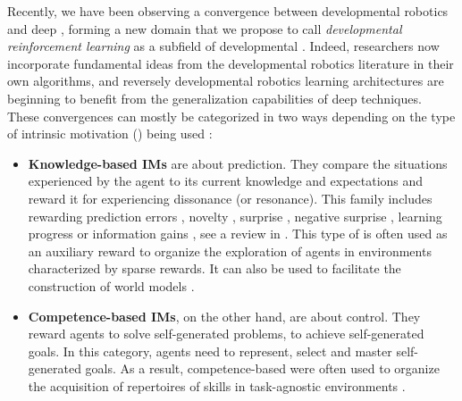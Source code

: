 Recently, we have been observing a convergence between developmental robotics and deep \rl, forming a new domain that we propose to call \textit{developmental reinforcement learning} as a subfield of developmental \ai. Indeed, \rl researchers now incorporate fundamental ideas from the developmental robotics literature in their own algorithms, and reversely developmental robotics learning architectures are beginning to benefit from the generalization capabilities of deep \rl techniques. These convergences can mostly be categorized in two ways depending on the type of intrinsic motivation (\ims) being used \citep{oudeyer2007intrinsic}:
\begin{itemize}
    \item
    \textbf{Knowledge-based IMs} are about prediction. They compare the situations experienced by the agent to its current knowledge and expectations and reward it for experiencing dissonance (or resonance). This family includes \ims rewarding prediction errors \citep{schmidhuber1991possibility,pathak2017curiosity}, novelty \citep{bellemare2016unifying,burda2018exploration,raileanu2020ride}, surprise \citep{achiam2017surprise}, negative surprise \citep{berseth2019smirl}, learning progress \citep{lopes2012exploration,kim2020active} or information gains \citep{houthooft2016vime}, see a review in \citep{linke2019adapting}. This type of \im is often used as an auxiliary reward to organize the exploration of agents in environments characterized by sparse rewards. It can also be used to facilitate the construction of world models \citep{lopes2012exploration,kim2020active,sekar2020planning}.
    \item
    \textbf{Competence-based IMs}, on the other hand, are about control. They reward agents to solve self-generated problems, to achieve self-generated goals. In this category, agents need to represent, select and master self-generated goals. As a result, competence-based \ims were often used to organize the acquisition of repertoires of skills in task-agnostic environments \citep{baranes2010intrinsically,baranes2013active,santucci2016grail,forestier2016modular,nair2018visual,warde2018unsupervised,curious,blaes2019control,pong2019skew}.
\end{itemize}

